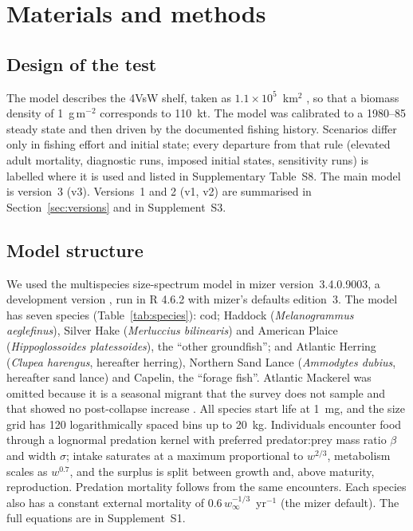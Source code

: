 \documentclass[12pt,letterpaper,fleqn]{article}
\newcommand{\yr}{yr$^{-1}$}
\newcommand{\gm}{g\,m$^{-2}$}
\begin{document}
\section{Materials and methods}

\subsection{Design of the test}\label{sec:design}

The model describes the 4VsW shelf, taken as $1.1\times10^{5}$~km$^{2}$ \autocite{dfo2010greyseals}, so that a biomass density of 1~\gm{} corresponds to 110~kt. The model was calibrated to a 1980--85 steady state and then driven by the documented fishing history. Scenarios differ only in fishing effort and initial state; every departure from that rule (elevated adult mortality, diagnostic runs, imposed initial states, sensitivity runs) is labelled where it is used and listed in Supplementary Table~S8. The main model is version~3 (v3). Versions~1 and 2 (v1, v2) are summarised in Section~\ref{sec:versions} and in Supplement~S3.

\subsection{Model structure}\label{sec:model}

We used the multispecies size-spectrum model in mizer version~3.4.0.9003, a development version \autocite{scott2014mizer,delius2013mizer}, run in R 4.6.2 with mizer's defaults edition~3. The model has seven species (Table~\ref{tab:species}): cod; Haddock (\textit{Melanogrammus aeglefinus}), Silver Hake (\textit{Merluccius bilinearis}) and American Plaice (\textit{Hippoglossoides platessoides}), the ``other groundfish''; and Atlantic Herring (\textit{Clupea harengus}, hereafter herring), Northern Sand Lance (\textit{Ammodytes dubius}, hereafter sand lance) and Capelin, the ``forage fish''. Atlantic Mackerel was omitted because it is a seasonal migrant that the survey does not sample and that showed no post-collapse increase \autocite{adekoya2026code}. All species start life at 1~mg, and the size grid has 120 logarithmically spaced bins up to 20~kg. Individuals encounter food through a lognormal predation kernel with preferred predator:prey mass ratio $\beta$ and width $\sigma$; intake saturates at a maximum proportional to $w^{2/3}$, metabolism scales as $w^{0.7}$, and the surplus is split between growth and, above maturity, reproduction. Predation mortality follows from the same encounters. Each species also has a constant external mortality of $0.6\,w_\infty^{-1/3}$~\yr{} (the mizer default). The full equations are in Supplement~S1.
\end{document}
